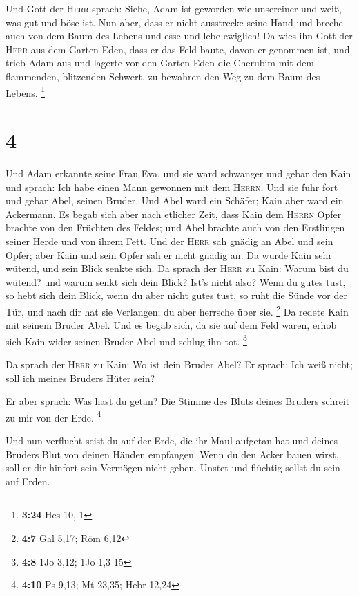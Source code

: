 Und Gott der \textsc{Herr} sprach: Siehe, Adam ist
geworden wie unsereiner und weiß, was gut und böse ist. Nun aber, dass
er nicht ausstrecke seine Hand und breche auch von dem Baum des Lebens
und esse und lebe ewiglich!  Da wies ihn Gott der
\textsc{Herr} aus dem Garten Eden, dass er das Feld baute, davon er
genommen ist,  und trieb Adam aus und lagerte vor den
Garten Eden die Cherubim mit dem flammenden, blitzenden Schwert, zu
bewahren den Weg zu dem Baum des Lebens. \footnote{\textbf{3:24} Hes
  10,-1}

\hypertarget{section-1}{%
\section{4}\label{section-1}}

 Und Adam erkannte seine Frau Eva, und sie ward schwanger
und gebar den Kain und sprach: Ich habe einen Mann gewonnen mit dem
\textsc{Herrn}.  Und sie fuhr fort und gebar Abel, seinen
Bruder. Und Abel ward ein Schäfer; Kain aber ward ein Ackermann.
 Es begab sich aber nach etlicher Zeit, dass Kain dem
\textsc{Herrn} Opfer brachte von den Früchten des Feldes; 
und Abel brachte auch von den Erstlingen seiner Herde und von ihrem
Fett. Und der \textsc{Herr} sah gnädig an Abel und sein Opfer;
 aber Kain und sein Opfer sah er nicht gnädig an. Da wurde
Kain sehr wütend, und sein Blick senkte sich.  Da sprach
der \textsc{Herr} zu Kain: Warum bist du wütend? und warum senkt sich
dein Blick?  Ist's nicht also? Wenn du gutes tust, so hebt
sich dein Blick, wenn du aber nicht gutes tust, so ruht die Sünde vor
der Tür, und nach dir hat sie Verlangen; du aber herrsche über sie.
\footnote{\textbf{4:7} Gal 5,17; Röm 6,12}  Da redete Kain
mit seinem Bruder Abel. Und es begab sich, da sie auf dem Feld waren,
erhob sich Kain wider seinen Bruder Abel und schlug ihn tot. \footnote{\textbf{4:8}
  1Jo 3,12; 1Jo 1,3-15}

 Da sprach der \textsc{Herr} zu Kain: Wo ist dein Bruder
Abel? Er sprach: Ich weiß nicht; soll ich meines Bruders Hüter sein?

 Er aber sprach: Was hast du getan? Die Stimme des Bluts
deines Bruders schreit zu mir von der Erde. \footnote{\textbf{4:10} Ps
  9,13; Mt 23,35; Hebr 12,24}

 Und nun verflucht seist du auf der Erde, die ihr Maul
aufgetan hat und deines Bruders Blut von deinen Händen empfangen.
 Wenn du den Acker bauen wirst, soll er dir hinfort sein
Vermögen nicht geben. Unstet und flüchtig sollst du sein auf Erden.

